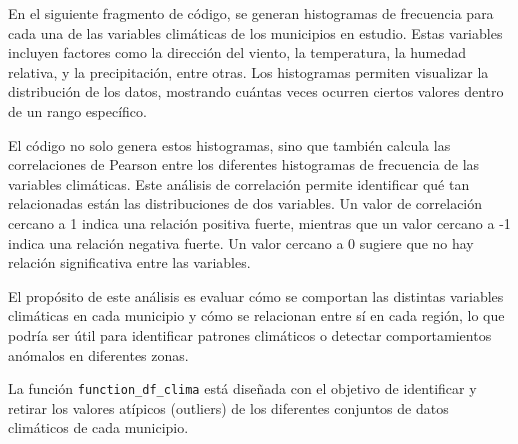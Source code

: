 \documentclass[11pt]{article}
\begin{document}
    En el siguiente fragmento de código, se generan histogramas de
frecuencia para cada una de las variables climáticas de los municipios
en estudio. Estas variables incluyen factores como la dirección del
viento, la temperatura, la humedad relativa, y la precipitación, entre
otras. Los histogramas permiten visualizar la distribución de los datos,
mostrando cuántas veces ocurren ciertos valores dentro de un rango
específico.

El código no solo genera estos histogramas, sino que también calcula las
correlaciones de Pearson entre los diferentes histogramas de frecuencia
de las variables climáticas. Este análisis de correlación permite
identificar qué tan relacionadas están las distribuciones de dos
variables. Un valor de correlación cercano a 1 indica una relación
positiva fuerte, mientras que un valor cercano a -1 indica una relación
negativa fuerte. Un valor cercano a 0 sugiere que no hay relación
significativa entre las variables.

El propósito de este análisis es evaluar cómo se comportan las distintas
variables climáticas en cada municipio y cómo se relacionan entre sí en
cada región, lo que podría ser útil para identificar patrones climáticos
o detectar comportamientos anómalos en diferentes zonas.

    La función \texttt{function\_df\_clima} está diseñada con el objetivo de
identificar y retirar los valores atípicos (outliers) de los diferentes
conjuntos de datos climáticos de cada municipio.
\end{document}
